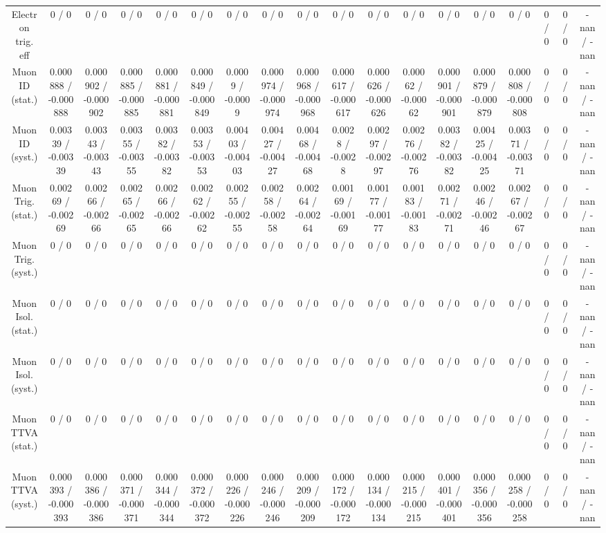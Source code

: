 \documentclass[10pt]{article}
\begin{document}
\begin{table}[htbp]
\begin{center}
\begin{tabular}{|c|c|c|c|c|c|c|c|c|c|c|c|c|c|c|c|c|c|}
  Electron trig. eff & 0 / 0 & 0 / 0 & 0 / 0 & 0 / 0 & 0 / 0 & 0 / 0 & 0 / 0 & 0 / 0 & 0 / 0 & 0 / 0 & 0 / 0 & 0 / 0 & 0 / 0 & 0 / 0 & 0 / 0 & 0 / 0 & -nan / -nan \\ 
  Muon ID (stat.) & 0.000888 / -0.000888 & 0.000902 / -0.000902 & 0.000885 / -0.000885 & 0.000881 / -0.000881 & 0.000849 / -0.000849 & 0.0009 / -0.0009 & 0.000974 / -0.000974 & 0.000968 / -0.000968 & 0.000617 / -0.000617 & 0.000626 / -0.000626 & 0.00062 / -0.00062 & 0.000901 / -0.000901 & 0.000879 / -0.000879 & 0.000808 / -0.000808 & 0 / 0 & 0 / 0 & -nan / -nan \\ 
  Muon ID (syst.) & 0.00339 / -0.00339 & 0.00343 / -0.00343 & 0.00355 / -0.00355 & 0.00382 / -0.00382 & 0.00353 / -0.00353 & 0.00403 / -0.00403 & 0.00427 / -0.00427 & 0.00468 / -0.00468 & 0.0028 / -0.0028 & 0.00297 / -0.00297 & 0.00276 / -0.00276 & 0.00382 / -0.00382 & 0.00425 / -0.00425 & 0.00371 / -0.00371 & 0 / 0 & 0 / 0 & -nan / -nan \\ 
  Muon Trig. (stat.) & 0.00269 / -0.00269 & 0.00266 / -0.00266 & 0.00265 / -0.00265 & 0.00266 / -0.00266 & 0.00262 / -0.00262 & 0.00255 / -0.00255 & 0.00258 / -0.00258 & 0.00264 / -0.00264 & 0.00169 / -0.00169 & 0.00177 / -0.00177 & 0.00183 / -0.00183 & 0.00271 / -0.00271 & 0.00246 / -0.00246 & 0.00267 / -0.00267 & 0 / 0 & 0 / 0 & -nan / -nan \\ 
  Muon Trig. (syst.) & 0 / 0 & 0 / 0 & 0 / 0 & 0 / 0 & 0 / 0 & 0 / 0 & 0 / 0 & 0 / 0 & 0 / 0 & 0 / 0 & 0 / 0 & 0 / 0 & 0 / 0 & 0 / 0 & 0 / 0 & 0 / 0 & -nan / -nan \\ 
  Muon Isol. (stat.) & 0 / 0 & 0 / 0 & 0 / 0 & 0 / 0 & 0 / 0 & 0 / 0 & 0 / 0 & 0 / 0 & 0 / 0 & 0 / 0 & 0 / 0 & 0 / 0 & 0 / 0 & 0 / 0 & 0 / 0 & 0 / 0 & -nan / -nan \\ 
  Muon Isol. (syst.) & 0 / 0 & 0 / 0 & 0 / 0 & 0 / 0 & 0 / 0 & 0 / 0 & 0 / 0 & 0 / 0 & 0 / 0 & 0 / 0 & 0 / 0 & 0 / 0 & 0 / 0 & 0 / 0 & 0 / 0 & 0 / 0 & -nan / -nan \\ 
  Muon TTVA (stat.) & 0 / 0 & 0 / 0 & 0 / 0 & 0 / 0 & 0 / 0 & 0 / 0 & 0 / 0 & 0 / 0 & 0 / 0 & 0 / 0 & 0 / 0 & 0 / 0 & 0 / 0 & 0 / 0 & 0 / 0 & 0 / 0 & -nan / -nan \\ 
  Muon TTVA (syst.) & 0.000393 / -0.000393 & 0.000386 / -0.000386 & 0.000371 / -0.000371 & 0.000344 / -0.000344 & 0.000372 / -0.000372 & 0.000226 / -0.000226 & 0.000246 / -0.000246 & 0.000209 / -0.000209 & 0.000172 / -0.000172 & 0.000134 / -0.000134 & 0.000215 / -0.000215 & 0.000401 / -0.000401 & 0.000356 / -0.000356 & 0.000258 / -0.000258 & 0 / 0 & 0 / 0 & -nan / -nan \\ 

\end{tabular}
\end{center}
\end{table}
\end{document}
